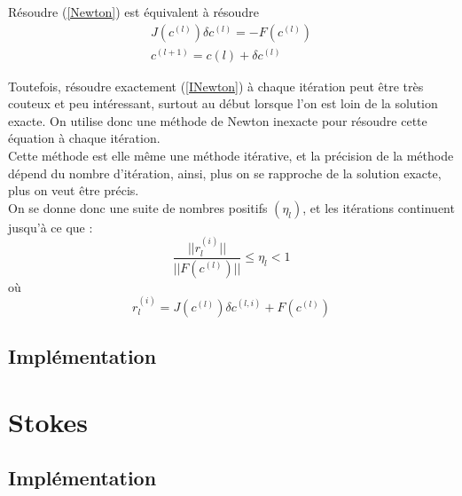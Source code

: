 Résoudre (\ref{Newton}) est équivalent à résoudre 
\begin{equation}\label{INewton}
\begin{aligned}
J(c^{(l)})\delta c^{(l)} = -F(c^{(l)})\\
c^{(l+1)}=c{(l)}+\delta c^{(l)}
\end{aligned}
\end{equation}

Toutefois, résoudre exactement (\ref{INewton}) à chaque itération peut être très couteux et peu intéressant, surtout au début lorsque l'on est loin de la solution exacte. On utilise donc une méthode de Newton inexacte pour résoudre cette équation à chaque itération.\\
Cette méthode est elle même une méthode itérative, et la précision de la méthode dépend du nombre d'itération, ainsi, plus on se rapproche de la solution exacte, plus on veut être précis.
\\On se donne donc une suite de nombres positifs $(\eta_l)$, et les itérations continuent jusqu'à ce que :
\[ \frac{||r_l^{(i)}||}{||F(c^{(l)})||} \leq \eta_l<1 \]
où
\[ r_l^{(i)} = J(c^{(l)})\delta c^{(l,i)} + F(c^{(l)}) \]

\subsection{Implémentation}











\section{Stokes}
\subsection{Implémentation}





